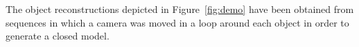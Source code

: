 The object reconstructions depicted in Figure~\ref{fig:demo} have been obtained from sequences in which a camera was moved in a loop around each object in order to generate a closed model.


